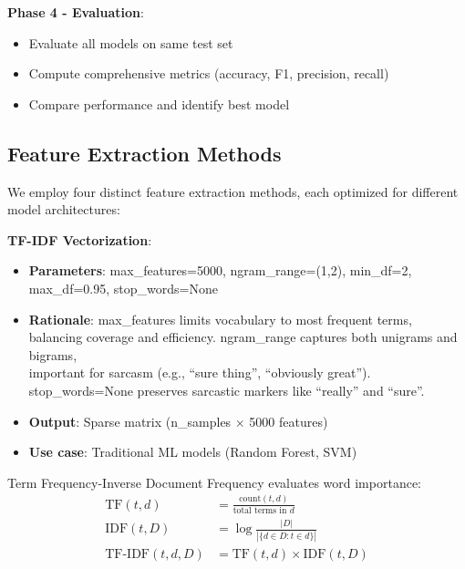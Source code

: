 \documentclass[11pt]{article}
\begin{document}
\textbf{Phase 4 - Evaluation}:
\begin{itemize}
\item Evaluate all models on same test set
\item Compute comprehensive metrics (accuracy, F1, precision, recall)
\item Compare performance and identify best model
\end{itemize}

\subsection{Feature Extraction Methods}

We employ four distinct feature extraction methods, each optimized for different model architectures:

\textbf{TF-IDF Vectorization}: 
\begin{itemize}
\item \textbf{Parameters}: max\_features=5000, ngram\_range=(1,2), min\_df=2,\\ max\_df=0.95, stop\_words=None
\item \textbf{Rationale}: max\_features limits vocabulary to most frequent terms,\\ balancing coverage and efficiency. ngram\_range captures both unigrams and bigrams,\\ important for sarcasm (e.g., ``sure thing'', ``obviously great'').\\ stop\_words=None preserves sarcastic markers like ``really'' and ``sure''.
\item \textbf{Output}: Sparse matrix (n\_samples $\times$ 5000 features)
\item \textbf{Use case}: Traditional ML models (Random Forest, SVM)
\end{itemize}

Term Frequency-Inverse Document Frequency evaluates word importance:
\begin{align}
\text{TF}(t,d) &= \frac{\text{count}(t,d)}{\text{total terms in }d} \\
\text{IDF}(t,D) &= \log\frac{|D|}{|\{d \in D: t \in d\}|} \\
\text{TF-IDF}(t,d,D) &= \text{TF}(t,d) \times \text{IDF}(t,D)
\end{align}
\end{document}
